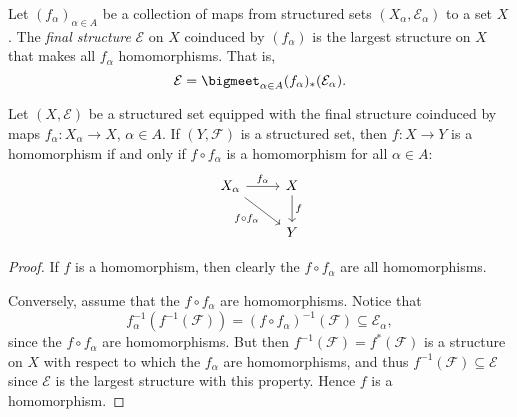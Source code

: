 \documentclass[article, a4paper, 11pt, oneside]{memoir}
\numberwithin{equation}{chapter}
\newcommand{\calE}{\mathcal{E}}
\newcommand{\calF}{\mathcal{F}}
\newcommand{\preim}{^{-1}}
\begin{document}
\begin{definition}
    Let $(f_\alpha)_{\alpha \in A}$ be a collection of maps from structured sets $(X_\alpha, \calE_\alpha)$ to a set $X$. The \emph{final structure} $\calE$ on $X$ coinduced by $(f_\alpha)$ is the largest structure on $X$ that makes all $f_\alpha$ homomorphisms. That is,
    \begin{equation*}
        \calE
            = \bigmeet_{\alpha \in A} (f_\alpha)_*(\calE_\alpha).
    \end{equation*}
\end{definition}


\begin{theorem}
    Let $(X,\calE)$ be a structured set equipped with the final structure coinduced by maps $f_\alpha \colon X_\alpha \to X$,  $\alpha \in A$. If $(Y,\calF)$ is a structured set, then $f \colon X \to Y$ is a homomorphism if and only if $f \circ f_\alpha$ is a homomorphism for all $\alpha \in A$:
    \begin{equation*}
        \begin{tikzcd}
            X_\alpha
                \ar[r, "f_\alpha"]
                \ar[dr, "f \circ f_\alpha", swap]
            & X
                \ar[d, "f"] \\
            & Y
        \end{tikzcd}
    \end{equation*}
\end{theorem}

\begin{proof}
    If $f$ is a homomorphism, then clearly the $f \circ f_\alpha$ are all homomorphisms.

    Conversely, assume that the $f \circ f_\alpha$ are homomorphisms. Notice that
    \begin{equation*}
        f_\alpha\preim(f\preim(\calF))
            = (f \circ f_\alpha)\preim(\calF)
            \subseteq \calE_\alpha,
    \end{equation*}
    since the $f \circ f_\alpha$ are homomorphisms. But then $f\preim(\calF) = f^*(\calF)$ is a structure on $X$ with respect to which the $f_\alpha$ are homomorphisms, and thus $f\preim(\calF) \subseteq \calE$ since $\calE$ is the largest structure with this property. Hence $f$ is a homomorphism.
\end{proof}
\end{document}
